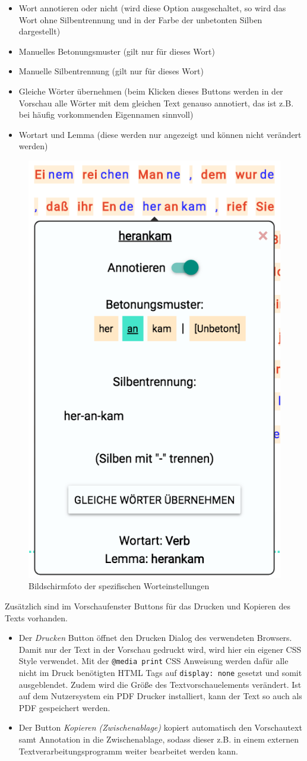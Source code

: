 \begin{itemize}
	\item Wort annotieren oder nicht (wird diese Option ausgeschaltet, so wird das Wort ohne Silbentrennung und in der Farbe der unbetonten Silben dargestellt)
	\item Manuelles Betonungsmuster (gilt nur für dieses Wort)
	\item Manuelle Silbentrennung (gilt nur für dieses Wort)
	\item Gleiche Wörter übernehmen (beim Klicken dieses Buttons werden in der Vorschau alle Wörter mit dem gleichen Text genauso annotiert, das ist z.B. bei häufig vorkommenden Eigennamen sinnvoll)
	\item Wortart und Lemma (diese werden nur angezeigt und können nicht verändert werden)
\end{itemize}

\begin{figure}[h!]
	\centering
	\includegraphics[width=.4\linewidth, frame]{figures/frontend/wordpopup}
	\caption{Bildschirmfoto der spezifischen Worteinstellungen}
	\label{fig:frontend-wordconf}
\end{figure}

Zusätzlich sind im Vorschaufenster Buttons für das Drucken und Kopieren des Texts vorhanden.
\begin{itemize}
	\item Der \textit{Drucken} Button öffnet den Drucken Dialog des verwendeten Browsers. Damit nur der Text in der Vorschau gedruckt wird, wird hier ein eigener CSS Style verwendet. Mit der \texttt{@media print} CSS Anweisung werden dafür alle nicht im Druck benötigten HTML Tags auf \texttt{display: none} gesetzt und somit ausgeblendet. Zudem wird die Größe des Textvorschauelements verändert. Ist auf dem Nutzersystem ein PDF Drucker installiert, kann der Text so auch als PDF gespeichert werden.
	
	\item Der Button \textit{Kopieren (Zwischenablage)} kopiert automatisch den Vorschautext samt Annotation in die Zwischenablage, sodass dieser z.B. in einem externen Textverarbeitungsprogramm weiter bearbeitet werden kann.
\end{itemize}

